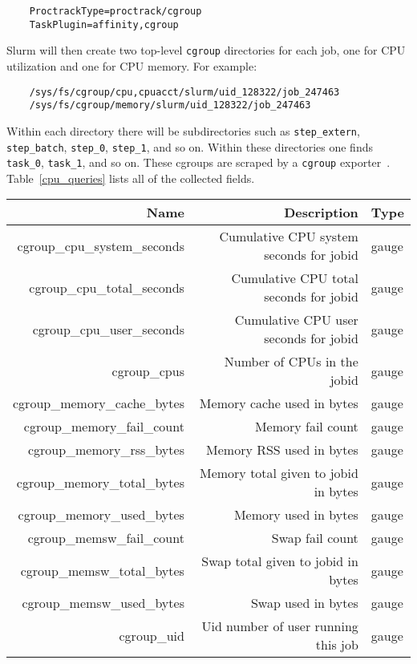 \begin{verbatim}
    ProctrackType=proctrack/cgroup
    TaskPlugin=affinity,cgroup
\end{verbatim}

\noindent
Slurm will then create two top-level \texttt{cgroup} directories for each job, one for CPU utilization and one for CPU memory. For example:

\begin{verbatim}
    /sys/fs/cgroup/cpu,cpuacct/slurm/uid_128322/job_247463
    /sys/fs/cgroup/memory/slurm/uid_128322/job_247463
\end{verbatim}

\noindent
Within each directory there will be subdirectories such as \texttt{step\_extern}, \texttt{step\_batch}, \texttt{step\_0}, \texttt{step\_1}, and so on. Within these directories one finds \texttt{task\_0}, \texttt{task\_1}, and so on. These cgroups are scraped by a \texttt{cgroup} exporter~\cite{cgroup_exporter}. Table~\ref{cpu_queries} lists all of the collected fields.

\begin{table*}
  \caption{cgroup metrics made available by the cgroups exporter.}
  \label{cpu_queries}
  \begin{tabular}{rrl}
    \toprule
    Name & Description & Type\\
    \midrule
cgroup\_cpu\_system\_seconds & Cumulative CPU system seconds for jobid & gauge\\
cgroup\_cpu\_total\_seconds & Cumulative CPU total seconds for jobid & gauge\\
cgroup\_cpu\_user\_seconds & Cumulative CPU user seconds for jobid & gauge\\
cgroup\_cpus & Number of CPUs in the jobid & gauge\\
cgroup\_memory\_cache\_bytes & Memory cache used in bytes & gauge\\
cgroup\_memory\_fail\_count & Memory fail count & gauge\\
cgroup\_memory\_rss\_bytes & Memory RSS used in bytes & gauge\\
cgroup\_memory\_total\_bytes & Memory total given to jobid in bytes & gauge\\
cgroup\_memory\_used\_bytes & Memory used in bytes & gauge\\
cgroup\_memsw\_fail\_count & Swap fail count & gauge\\
cgroup\_memsw\_total\_bytes & Swap total given to jobid in bytes & gauge\\
cgroup\_memsw\_used\_bytes & Swap used in bytes & gauge\\
cgroup\_uid & Uid number of user running this job & gauge\\
    \bottomrule
  \end{tabular}
\end{table*}

